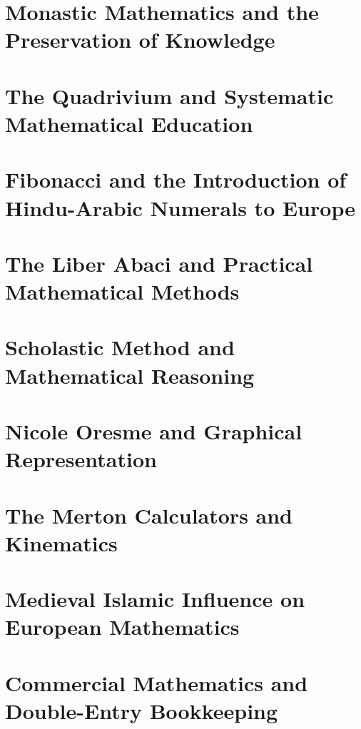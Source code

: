 \chapter{Monastic Mathematics and the Preservation of Knowledge  }
\chapter{The Quadrivium and Systematic Mathematical Education  }
\chapter{Fibonacci and the Introduction of Hindu-Arabic Numerals to Europe  }
\chapter{The Liber Abaci and Practical Mathematical Methods  }
\chapter{Scholastic Method and Mathematical Reasoning  }
\chapter{Nicole Oresme and Graphical Representation  }
\chapter{The Merton Calculators and Kinematics  }
\chapter{Medieval Islamic Influence on European Mathematics  }
\chapter {Commercial Mathematics and Double-Entry Bookkeeping}
